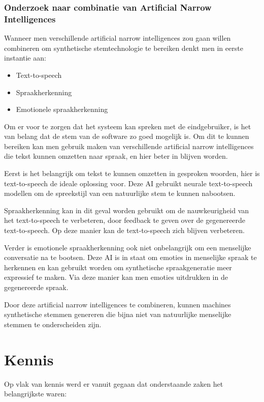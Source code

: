 \subsubsection{Onderzoek naar combinatie van Artificial Narrow Intelligences}

Wanneer men verschillende artificial narrow intelligences zou gaan willen combineren om synthetische stemtechnologie te bereiken denkt men in eerste instantie aan:

\begin{itemize}
    \item Text-to-speech
    \item Spraakherkenning
    \item Emotionele spraakherkenning
\end{itemize}

Om er voor te zorgen dat het systeem kan spreken met de eindgebruiker, is het van belang dat de stem van de software zo goed mogelijk is. Om dit te kunnen bereiken kan men gebruik maken van verschillende artificial narrow intelligences die tekst kunnen omzetten naar spraak, en hier beter in blijven worden.

Eerst is het belangrijk om tekst te kunnen omzetten in gesproken woorden, hier is text-to-speech de ideale oplossing voor. Deze AI gebruikt neurale text-to-speech modellen om de spreekstijl van een natuurlijke stem te kunnen nabootsen. 

Spraakherkenning kan in dit geval worden gebruikt om de nauwkeurigheid van het text-to-speech te verbeteren, door feedback te geven over de gegenereerde text-to-speech. Op deze manier kan de text-to-speech zich blijven verbeteren.

Verder is emotionele spraakherkenning ook niet onbelangrijk om een menselijke conversatie na te bootsen. Deze AI is in staat om emoties in menselijke spraak te herkennen en kan gebruikt worden om synthetische spraakgeneratie meer expressief te maken. Via deze manier kan men emoties uitdrukken in de gegenereerde spraak.

Door deze artificial narrow intelligences te combineren, kunnen machines synthetische stemmen genereren die bijna niet van natuurlijke menselijke stemmen te onderscheiden zijn.

\section{Kennis}

Op vlak van kennis werd er vanuit gegaan dat onderstaande zaken het belangrijkste waren:

